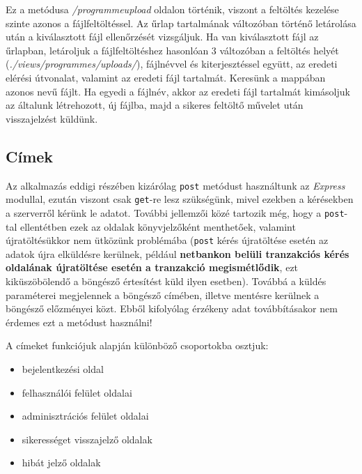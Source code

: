 Ez a metódusa \textit{/programmeupload} oldalon történik, viszont a feltöltés kezelése szinte azonos a fájlfeltöltéssel. Az űrlap tartalmának változóban történő letárolása után a kiválasztott fájl ellenőrzését vizsgáljuk. Ha van kiválasztott fájl az űrlapban, letároljuk a fájlfeltöltéshez hasonlóan 3 változóban a feltöltés helyét (\textit{./views/programmes/uploads/}), fájlnévvel és kiterjesztéssel együtt, az eredeti elérési útvonalat, valamint az eredeti fájl tartalmát. Keresünk a mappában azonos nevű fájlt. Ha egyedi a fájlnév, akkor az eredeti fájl tartalmát kimásoljuk az általunk létrehozott, új fájlba, majd a sikeres feltöltő művelet után visszajelzést küldünk.


\subsection{Címek}

Az alkalmazás eddigi részében kizárólag \texttt{post} metódust használtunk az \textit{Express} modullal, ezután viszont csak \texttt{get}-re lesz szükségünk, mivel ezekben a kérésekben a szerverről kérünk le adatot. További jellemzői közé tartozik még, hogy a \texttt{post}-tal ellentétben ezek az oldalak könyvjelzőként menthetőek, valamint újratöltésükkor nem ütközünk problémába (\texttt{post} kérés újratöltése esetén az adatok újra elküldésre kerülnek, például \textbf{netbankon belüli tranzakciós kérés oldalának újratöltése esetén a tranzakció megismétlődik}, ezt kiküszöbölendő a böngésző értesítést küld ilyen esetben). Továbbá a küldés paraméterei megjelennek a böngésző címében, illetve mentésre kerülnek a böngésző előzményei közt. Ebből kifolyólag érzékeny adat továbbításakor nem érdemes ezt a metódust használni!

A címeket funkciójuk alapján különböző csoportokba osztjuk:

\begin{itemize}
\item{bejelentkezési oldal}
\item{felhasználói felület oldalai}
\item{adminisztrációs felület oldalai}
\item{sikerességet visszajelző oldalak}
\item{hibát jelző oldalak}
\end{itemize}

\\

